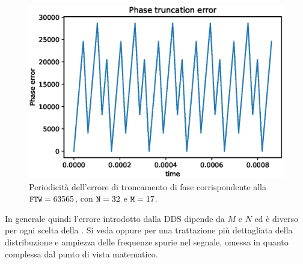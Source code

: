 \begin{figure}[H]
	\centering
	\includegraphics[width=0.85\columnwidth]{TeX_files/phase_truncation_error.eps}
	\caption{Periodicità dell'errore di troncamento di fase corrispondente alla $\texttt{FTW}=63565$, con $\texttt{N}=32$ e $\texttt{M}=17$.}
\end{figure}

In generale quindi l'errore introdotto dalla DDS dipende da $M$ e $N$ ed è diverso per ogni
scelta della . Si veda \cite{analogdevicessec4} oppure \cite{exactspurs} per una trattazione
più dettagliata della distribuzione e ampiezza delle frequenze spurie nel segnale,
omessa in quanto complessa dal punto di vista matematico.


